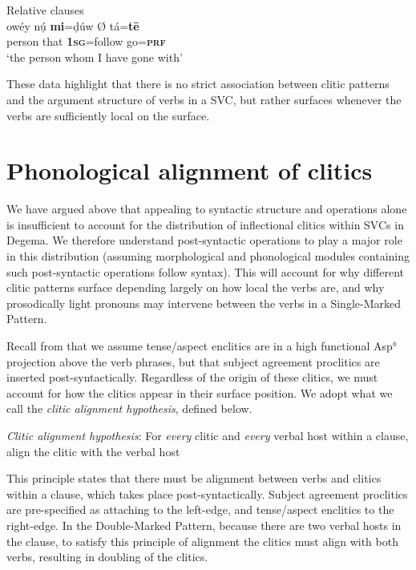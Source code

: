 \documentclass[output=paper]{langsci/langscibook}
\begin{document}
\ea
{Relative clauses} \\
\gll  owéy     nụ́     \textbf{mi}=ḍúw Ø tá=\textbf{tē}\\
     person    that    \textbf{\textsc{1sg}}=follow    go=\textbf{\textsc{prf}}\\
\glt ‘the person whom I have gone with’
\z

These data highlight that there is no strict association between clitic patterns and the argument structure of verbs in a SVC, but rather surfaces whenever the verbs are sufficiently local on the surface. 

\section{Phonological alignment of clitics} 

We have argued above that appealing to syntactic structure and operations alone is insufficient to account for the distribution of inflectional clitics within SVCs in Degema. We therefore understand post-syntactic operations to play a major role in this distribution (assuming morphological and phonological modules containing such post-syntactic operations follow syntax). This will account for why different clitic patterns surface depending largely on how local the verbs are, and why prosodically light pronouns may intervene between the verbs in a Single-Marked Pattern. 

Recall from  that we assume tense/aspect enclitics are in a high functional Asp° projection above the verb phrases, but that subject agreement proclitics are inserted post-syntactically. Regardless of the origin of these clitics, we must account for how the clitics appear in their surface position. We adopt what we call the \textit{clitic alignment hypothesis}, defined below. 


\ea
{\textit{Clitic alignment hypothesis}: For \textit{every} clitic and \textit{every} verbal host within a clause, align the clitic with the verbal host}
\z

This principle states that there must be alignment between verbs and clitics within a clause, which takes place post-syntactically. Subject agreement proclitics are pre-specified as attaching to the left-edge, and tense/aspect enclitics to the right-edge. In the Double-Marked Pattern, because there are two verbal hosts in the clause, to satisfy this principle of alignment the clitics must align with both verbs, resulting in doubling of the clitics. 
\end{document}
